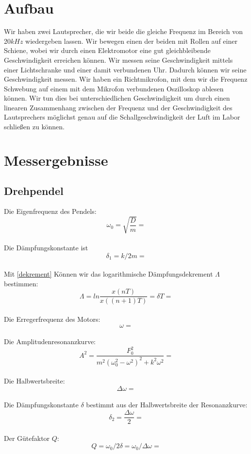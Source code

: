\documentclass{article}
\begin{document}
\section{Aufbau}
Wir haben zwei Lautsprecher, die wir beide die gleiche Frequenz im Bereich von 20$\si{kHz}$ wiedergeben lassen. Wir bewegen einen der beiden mit Rollen auf einer Schiene, wobei wir durch einen Elektromotor eine gut gleichbleibende Geschwindigkeit erreichen können. Wir messen seine Geschwindigkeit mittels einer Lichtschranke und einer damit verbundenen Uhr. Dadurch können wir seine Geschwindigkeit messen. Wir haben ein Richtmikrofon, mit dem wir die Frequenz Schwebung auf einem mit dem Mikrofon verbundenen Oszilloskop ablesen können. Wir tun dies bei unterschiedlichen Geschwindigkeit um durch einen linearen Zusammenhang zwischen der Frequenz und der Geschwindigkeit des Lautsprechers möglichst genau auf die Schallgeschwindigkeit der Luft im Labor schließen zu können.
\section{Messergebnisse}

\subsection{Drehpendel}
Die Eigenfrequenz des Pendels:
$$\omega_0=\sqrt{\frac{D}{m}}=$$
\\
Die Dämpfungskonstante ist
$$\delta_1=k/2m=$$
\\
Mit \ref{dekrement} Können wir das logarithmische Dämpfungsdekrement $\Lambda$ bestimmen:
$$\Lambda=ln\frac{x(nT)}{x((n+1)T)}=\delta T=$$
\\
Die Erregerfrequenz des Motors:
$$\omega=$$
\\
Die Amplitudenresonanzkurve:
$$A^2=\frac{F_0^2}{m^2(\omega_0^2-\omega^2)^2+k^2\omega^2}=$$
\\
Die Halbwertsbreite:
$$\Delta \omega=$$
\\
Die Dämpfungskonstante $\delta$ bestimmt aus der Halbwertsbreite der Resonanzkurve:
$$\delta_2=\frac{\Delta \omega}{2}=$$
\\
Der Gütefaktor $Q$:
$$Q=\omega_0/2\delta=\omega_0/\Delta \omega=$$
\end{document}
